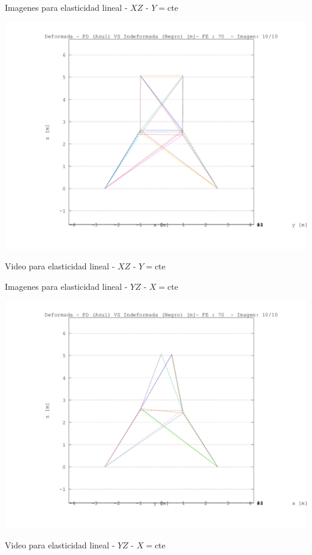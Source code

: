 \documentclass[a4paper,11pt]{article}
\begin{document}
\newpage       
\begin{center}       
Imagenes para elasticidad lineal -  $XZ$ - $Y=\text{cte}$ 

\includegraphics[width=.80\textwidth]{../../XY_XZ_YZ/XZ/deformada/torre_deformada_XZ_10.png}      


Video para elasticidad lineal -  $XZ$ - $Y=\text{cte}$ 


\end{center}       
\newpage       
\begin{center}       
Imagenes para elasticidad lineal -  $YZ$ - $X=\text{cte}$ 

\includegraphics[width=.80\textwidth]{../../XY_XZ_YZ/YZ/deformada/torre_deformada_YZ_10.png}      


Video para elasticidad lineal -  $YZ$ - $X=\text{cte}$ 


\end{center}       
\newpage       
\end{document}

